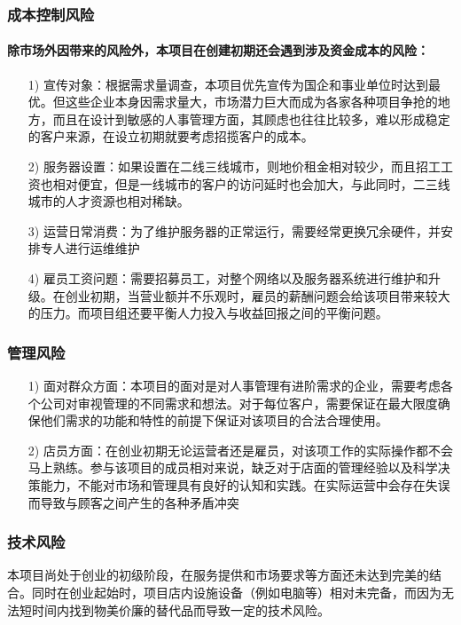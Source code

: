 \documentclass[UTF8]{ctexart}
\begin{document}
\subsubsection{成本控制风险}
\paragraph{除市场外因带来的风险外，本项目在创建初期还会遇到涉及资金成本的风险：}
\begin{itemize}

	\item[1)]宣传对象：根据需求量调查，本项目优先宣传为国企和事业单位时达到最优。但这些企业本身因需求量大，市场潜力巨大而成为各家各种项目争抢的地方，而且在设计到敏感的人事管理方面，其顾虑也往往比较多，难以形成稳定的客户来源，在设立初期就要考虑招揽客户的成本。


	\item[2)]服务器设置：如果设置在二线三线城市，则地价租金相对较少，而且招工工资也相对便宜，但是一线城市的客户的访问延时也会加大，与此同时，二三线城市的人才资源也相对稀缺。


	\item[3)]运营日常消费：为了维护服务器的正常运行，需要经常更换冗余硬件，并安排专人进行运维维护


	\item[4)]雇员工资问题：需要招募员工，对整个网络以及服务器系统进行维护和升级。在创业初期，当营业额并不乐观时，雇员的薪酬问题会给该项目带来较大的压力。而项目组还要平衡人力投入与收益回报之间的平衡问题。
\end{itemize}
\subsubsection{管理风险}
\begin{itemize}
	\item[1)]面对群众方面：本项目的面对是对人事管理有进阶需求的企业，需要考虑各个公司对审视管理的不同需求和想法。对于每位客户，需要保证在最大限度确保他们需求的功能和特性的前提下保证对该项目的合法合理使用。

	\item[2)]店员方面：在创业初期无论运营者还是雇员，对该项工作的实际操作都不会马上熟练。参与该项目的成员相对来说，缺乏对于店面的管理经验以及科学决策能力，不能对市场和管理具有良好的认知和实践。在实际运营中会存在失误而导致与顾客之间产生的各种矛盾冲突
\end{itemize}
\subsubsection{技术风险}
本项目尚处于创业的初级阶段，在服务提供和市场要求等方面还未达到完美的结合。同时在创业起始时，项目店内设施设备（例如电脑等）相对未完备，而因为无法短时间内找到物美价廉的替代品而导致一定的技术风险。
\end{document}
